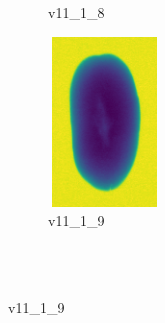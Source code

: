 \documentclass[11pt]{article}
\begin{document}
\begin{figure}
\begin{subfigure}[b]{0.15\textwidth}
        \caption{v11\_1\_8}
         \label{fig:five over x}
     \end{subfigure}
     \hfill
    \begin{subfigure}[b]{0.15\textwidth}
         \centering
         \includegraphics[width=3cm, height=4.5cm]{images/kartofler/v11_1_9_cut.png}
        \caption{v11\_1\_9}
         \label{fig:five over x}
     \end{subfigure} 
     
     
     \\ \\
     

\end{figure}
\end{document}
